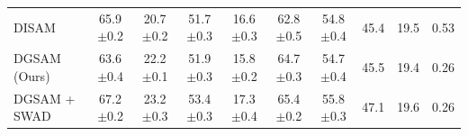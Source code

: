 \documentclass{article}
\theoremstyle{plain}
\theoremstyle{definition}
\theoremstyle{remark}
\begin{document}
\begin{table}[!ht]
\begin{tabular}{l|cccccc|ccc}
DISAM \cite{zhang2024disam} & {65.9\scriptsize$\pm$0.2} & {20.7\scriptsize$\pm$0.2} & {51.7\scriptsize$\pm$0.3} & {16.6\scriptsize$\pm$0.3} & {62.8\scriptsize$\pm$0.5} & {54.8\scriptsize$\pm$0.4} & 45.4 & 19.5 & 0.53 \\
DGSAM (Ours) & {63.6\scriptsize$\pm$0.4} & {22.2\scriptsize$\pm$0.1} & {51.9\scriptsize$\pm$0.3} & {15.8\scriptsize$\pm$0.2} & {64.7\scriptsize$\pm$0.3} & {54.7\scriptsize$\pm$0.4} & 45.5 & 19.4 & 0.26 \\
DGSAM + SWAD & {67.2\scriptsize$\pm$0.2} & {23.2\scriptsize$\pm$0.3} & {53.4\scriptsize$\pm$0.3} & {17.3\scriptsize$\pm$0.4} & {65.4\scriptsize$\pm$0.2} & {55.8\scriptsize$\pm$0.3} & 47.1 & 19.6 & 0.26 \\\bottomrule
\end{tabular}
\end{table}

\clearpage



\end{document}
